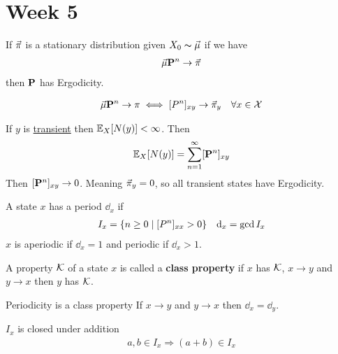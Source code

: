 \documentclass[12pt,a4paper]{article}
\begin{document}
\section{Week 5}
\begin{defn}[Ergodicity]
    If $\va\pi$ is a stationary distribution given $X_0 \thicksim \va\mu$  if we have 
    \begin{align*}
        \va\mu \vb P^n \rightarrow \va\pi
    \end{align*}
    then $\vb P$ has Ergodicity. 
\end{defn}
\begin{thm}
    \begin{align*}
        \va\mu \vb P^n \rightarrow \pi \iff [P^n]_{xy} \rightarrow \va\pi_y && \forall x\in \cal X
    \end{align*}
\end{thm}
\begin{remark}
    If $y$ is \hyperref[recurrent]{transient} then $\mathbb{E}_X[N(y)] < \infty$. Then 
    \begin{align*}
        \mathbb{E}_X[N(y)] = \sum\limits_{n=1}^{\infty} [\vb P^n]_{xy}
    \end{align*}
    Then $[\vb P^n]_{xy} \rightarrow 0$. Meaning $\va\pi_y = 0$, so all transient states have Ergodicity.
\end{remark}
\begin{defn}[Periodicity]
    A state $x$ has a period $\dd_x$ if 
    \begin{align*}
        & I_x = \{n\geq 0 \;\vert\; [P^n]_{xx} > 0\}
        &\dd_x = \gcd I_x 
    \end{align*}
    $x$ is {\color{deepred} aperiodic} if $\dd_x = 1$ and {\color{deepred} periodic} if $\dd_x > 1$.   
\end{defn}

\begin{defn}
    A property $\cal K$ of a state $x$ is called a \textbf{class property} if 
    $x$ has $\cal K$, $x\to y$ and $y\to x$ then $y$ has $\cal K$. 
\end{defn}

\begin{lemma}{Periodicity is a class property}
    If $x\to y$ and $y\to x$ then $\dd_x = \dd_y$.
\end{lemma}

\begin{lemma}{$I_x$ is closed under addition}
    \begin{align*}
        a,b\in I_x \Rightarrow (a+b)\in I_x
    \end{align*}
\end{lemma}
\end{document}
